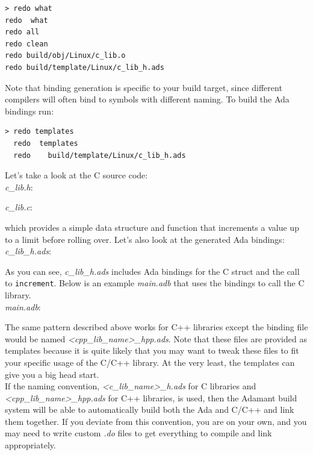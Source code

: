 \vspace{5mm} %
\begin{verbatim}
> redo what
redo  what
redo all
redo clean
redo build/obj/Linux/c_lib.o
redo build/template/Linux/c_lib_h.ads
\end{verbatim}
\vspace{5mm} %

Note that binding generation is specific to your build target, since different compilers will often bind to symbols with different naming. To build the Ada bindings run:

\vspace{5mm} %
\begin{verbatim}
> redo templates
  redo  templates
  redo    build/template/Linux/c_lib_h.ads
\end{verbatim}
\vspace{5mm} %

Let's take a look at the C source code: \\

\textit{c\_lib.h}:

\textit{c\_lib.c}:

which provides a simple data structure and function that increments a value up to a limit before rolling over. Let's also look at the generated Ada bindings: \\

\textit{c\_lib\_h.ads}:

As you can see, \textit{c\_lib\_h.ads} includes Ada bindings for the C struct and the call to \texttt{increment}. Below is an example \textit{main.adb} that uses the bindings to call the C library. \\

\textit{main.adb}:

The same pattern described above works for C++ libraries except the binding file would be named \textit{<cpp\_lib\_name>\_hpp.ads}. Note that these files are provided as templates because it is quite likely that you may want to tweak these files to fit your specific usage of the C/C++ library. At the very least, the templates can give you a big head start. \\

If the naming convention, \textit{<c\_lib\_name>\_h.ads} for C libraries and \textit{<cpp\_lib\_name>\_hpp.ads} for C++ libraries, is used, then the Adamant build system will be able to automatically build both the Ada and C/C++ and link them together. If you deviate from this convention, you are on your own, and you may need to write custom \textit{.do} files to get everything to compile and link appropriately. \\

